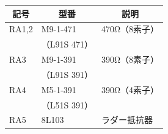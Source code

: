 \documentclass[handout]{beamer}        %
\begin{document}
\begin{frame}
\begin{minipage}{0.54\columnwidth}
\begin{center}
{\begin{tabular}{l|l|l}
        \hline
        \hline
        \multicolumn{1}{c|}{記号} &
        \multicolumn{1}{c|}{型番} &
        \multicolumn{1}{c}{説明} \\
        \hline
        RA1,2 & M9-1-471   & 470Ω（8素子） \\
        &（L91S 471）&               \\
        RA3   & M9-1-391   & 390Ω（8素子） \\
        &（L91S 391）&               \\
        RA4   & M5-1-391   & 390Ω（4素子） \\
        &（L51S 391）&               \\
        RA5   & 8L103      & ラダー抵抗器  \\
      \end{tabular}}
    \end{center}
  \end{minipage}
\end{frame}
\end{document}
